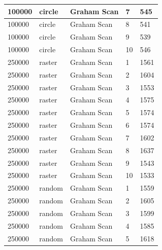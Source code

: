 \documentclass[12pt]{article}
\begin{document}
\begin{longtable}{|l|l|l|l|l|}
100000       & circle            & Graham Scan & 7          & 545                           \\ \hline
100000       & circle            & Graham Scan & 8          & 541                           \\ \hline
100000       & circle            & Graham Scan & 9          & 539                           \\ \hline
100000       & circle            & Graham Scan & 10         & 546                           \\ \hline
250000       & raster            & Graham Scan & 1          & 1561                          \\ \hline
250000       & raster            & Graham Scan & 2          & 1604                          \\ \hline
250000       & raster            & Graham Scan & 3          & 1553                          \\ \hline
250000       & raster            & Graham Scan & 4          & 1575                          \\ \hline
250000       & raster            & Graham Scan & 5          & 1574                          \\ \hline
250000       & raster            & Graham Scan & 6          & 1574                          \\ \hline
250000       & raster            & Graham Scan & 7          & 1602                          \\ \hline
250000       & raster            & Graham Scan & 8          & 1637                          \\ \hline
250000       & raster            & Graham Scan & 9          & 1543                          \\ \hline
250000       & raster            & Graham Scan & 10         & 1533                          \\ \hline
250000       & random            & Graham Scan & 1          & 1559                          \\ \hline
250000       & random            & Graham Scan & 2          & 1605                          \\ \hline
250000       & random            & Graham Scan & 3          & 1599                          \\ \hline
250000       & random            & Graham Scan & 4          & 1585                          \\ \hline
250000       & random            & Graham Scan & 5          & 1618                          \\ \hline

\end{longtable}
\end{document}
